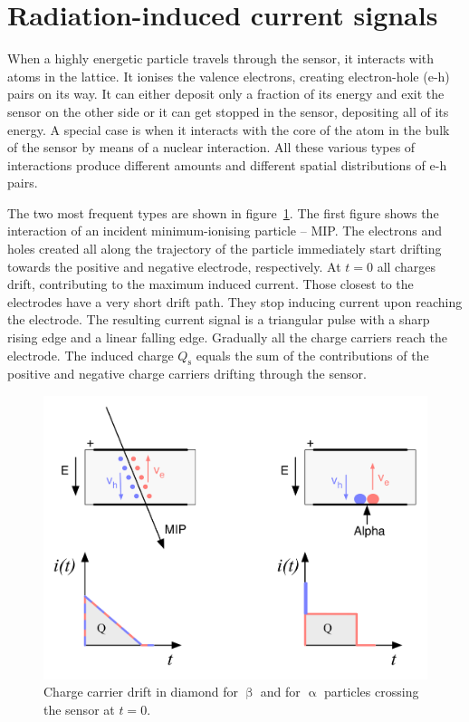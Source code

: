 \section{Radiation-induced current signals}


When a highly energetic particle travels through the sensor, it interacts with atoms in the lattice. It ionises the valence electrons, creating electron-hole (e-h) pairs on its way. It can either deposit only a fraction of its energy and exit the sensor on the other side or it can get stopped in the sensor, depositing all of its energy. A special case is when it interacts with the core of the atom in the bulk of the sensor by means of a nuclear interaction. All these various types of interactions produce different amounts and different spatial distributions of e-h pairs. 

The two most frequent types are shown in figure~\ref{fig:drift}. The first figure shows the interaction of an incident minimum-ionising particle -- MIP. The electrons and holes created all along the trajectory of the particle immediately start drifting towards the positive and negative electrode, respectively. At $t=0$ all charges drift, contributing to the maximum induced current. Those closest to the electrodes have a very short drift path. They stop inducing current upon reaching the electrode. The resulting current signal is a triangular pulse with a sharp rising edge and a linear falling edge. Gradually all the charge carriers reach the electrode. The induced charge $Q_\mathrm{s}$ equals the sum of the contributions of the positive and negative charge carriers drifting through the sensor. 

\begin{figure}[!t]
\begin{center}
\includegraphics[width=0.6\linewidth]{02_pulse_formation/pics/plots/driftboth}
\caption{Charge carrier drift in diamond for $\upbeta$ and for $\upalpha$ particles crossing the sensor at $t=0$.}
\label{fig:drift}
\end{center}
\end{figure}

